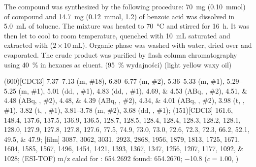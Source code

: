 The compound was synthesized by the following procedure:
\SI{70}{\milli\gram} (\SI{0.10}{\milli\mol}) of compound  and
\SI{14.7}{\milli\gram} (\SI{0.12}{\milli\mol}, \SI{1.2}{\equiv}) of benzoic acid
was dissolved in \SI{5.0}{\milli\liter} of toluene.
The mixture was heated to \SI{70}{\degreeCelsius} and stirred for \SI{16}{\hour}.
It was then let to cool to room temperature, quenched with \SI{10}{\milli\liter} saturated  and extracted with  ($2 \times \SI{10}{\milli\liter}$).
Organic phase was washed with water, dried over  and evaporated.
The crude product was purified by flash column chromatography using \SI{40}{\percent}  in hexanes as eluent.
(\SI{95}{\percent} wydajności) (light yellow waxy oil)

\begin{fullexp}
	\NMR(600)[CDCl3] \numrange{7.37}{7.13} (m, \#{18}), \numrange{6.80}{6.77} (m, \#{2}), \numrange{5.36}{5.33} (m, \#{1}), \numrange{5.29}{5.25} (m, \#{1}), \num{5.01} (dd, , \#{1}), \num{4.83} (dd, , \#{1}), \numlist{4.69;4.53} (ABq, , \#{2}), \numlist{4.51;4.48} (ABq, , \#{2}), \numlist{4.48;4.39} (ABq, , \#{2}), \numlist{4.34;4.01} (ABq, , \#{2}), \num{3.98} (t, , \#{1}), \num{3.82} (t, , \#{1}), \numrange{3.81}{3.78} (m, \#{2}), \num{3.68} (dd, , \#{1});
	(151)[CDCl3] \numlist{161.6; 148.4; 137.6; 137.5; 136.9; 136.5; 128.7; 128.5; 128.4; 128.4; 128.3; 128.2; 128.1; 128.0; 127.9; 127.8; 127.8; 127.6; 77.5; 74.9; 73.0; 73.0; 72.6; 72.3; 72.3; 66.2; 52.1; 49.5; 47.9};
	[film] \numlist{3087; 3062; 3031; 2923; 2868; 1956; 1879; 1813; 1725; 1671; 1604; 1585; 1567; 1496; 1454; 1421; 1393; 1367; 1347; 1256; 1207; 1177; 1092; 1028};
	 (ESI-TOF) m/z calcd for : \num{654.2692} found: \num{654.2670};
	\data{[$\alpha^{23}_D$]~$=$} \num{-10.8} ($c = 1.00$, )
\end{fullexp}

